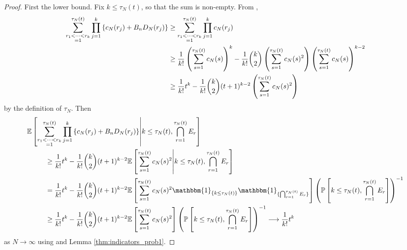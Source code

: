 \documentclass{article}
\newcommand{\Prob}{\mathbb{P}}
\newcommand{\E}{\mathbb{E}}
\newcommand{\I}[1]{\mathbbm{1}_{\{#1\}}}
\newcommand{\1}[1]{\mathbbm{1}_{#1}}
\begin{document}
\begin{proof}
First the lower bound. 
Fix $k\leq \tau_N(t)$, so that the sum is non-empty.
From \citet[Equation (8)]{koskela2018},
\begin{align}
\sum_{\substack{r_1<\dots<r_k \\ =1}}^{\tau_N(t)}\prod_{j=1}^k 
\left\{ c_N(r_j) + B_n D_N(r_j) \right\}
&\geq \sum_{\substack{r_1<\dots<r_k \\ =1}}^{\tau_N(t)}\prod_{j=1}^k c_N(r_j) \notag\\
&\geq \frac{1}{k!} \left( \sum_{s=1}^{\tau_N(t)} c_N(s) \right)^k 
- \frac{1}{k!} \binom{k}{2} \left( \sum_{s=1}^{\tau_N(t)} c_N(s)^2 \right)
\left( \sum_{s=1}^{\tau_N(t)} c_N(s) \right)^{k-2} \notag\\
&\geq \frac{1}{k!} t^k
 - \frac{1}{k!} \binom{k}{2} (t+1)^{k-2} \left( \sum_{s=1}^{\tau_N(t)} c_N(s)^2 \right) \label{eq:14}
\end{align}
by the definition of $\tau_N$.
Then
\begin{align}\label{eq:10}
\E &\left[ \sum_{\substack{r_1<\dots<r_k \\ =1}}^{\tau_N(t)}\prod_{j=1}^k 
\left\{ c_N(r_j) + B_n D_N(r_j) \right\}  
\middle| k\leq\tau_N(t), \bigcap_{r=1}^{\tau_N(t)} E_r \right] \notag\\
&\qquad \geq \frac{1}{k!} t^k - \frac{1}{k!} \binom{k}{2} (t+1)^{k-2} \E\left[ \sum_{s=1}^{\tau_N(t)} c_N(s)^2 \middle| k\leq\tau_N(t), \bigcap_{r=1}^{\tau_N(t)} E_r \right] \notag\\
&\qquad = \frac{1}{k!} t^k - \frac{1}{k!} \binom{k}{2} (t+1)^{k-2} \E\left[ \sum_{s=1}^{\tau_N(t)} c_N(s)^2 \I{k\leq\tau_N(t)} \I{\bigcap_{r=1}^{\tau_N(t)} E_r} \right] \left(\Prob \left[k\leq\tau_N(t), \bigcap_{r=1}^{\tau_N(t)} E_r \right] \right)^{-1}  \notag\\
&\qquad \geq \frac{1}{k!} t^k - \frac{1}{k!} \binom{k}{2} (t+1)^{k-2} \E\left[ \sum_{s=1}^{\tau_N(t)} c_N(s)^2 \right]
\left(\Prob \left[k\leq\tau_N(t), \bigcap_{r=1}^{\tau_N(t)} E_r \right] \right)^{-1}
\longrightarrow \frac{1}{k!} t^k
\end{align}
as $N\to\infty$ using \citet[Equation (5)]{brown2020} and Lemma \ref{thm:indicators_prob1}. %


\end{proof}
\end{document}
